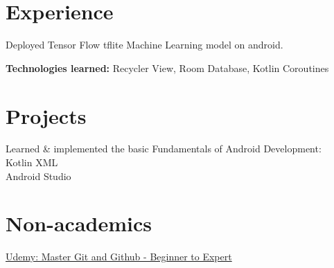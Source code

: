 \documentclass[]{deedy-resume-openfont}
\begin{document}
\begin{minipage}[t]{0.66\textwidth} 


\section{Experience}

\vspace{\topsep} %
\begin{tightemize}
\item Deployed Tensor Flow tflite Machine Learning model on android.
\item \textbf{Technologies learned: } Recycler View, Room Database, Kotlin Coroutines
\end{tightemize}
\sectionsep







\section{Projects}

\begin{tightemize}
\item Learned \& implemented the basic Fundamentals of Android Development: \\
\quad \textbullet{} Kotlin \textbullet{} XML \\
\quad \textbullet{} Android Studio \\
\end{tightemize}
\sectionsep




\section{Non-academics}
\begin{tightemize} 
\item \href{https://www.udemy.com/certificate/UC-b3157d51-19c3-4510-a924-2206bc5a0903/}{Udemy: Master Git and Github - Beginner to Expert}
\end{tightemize}
\sectionsep



%
% 
% 

\end{minipage} 
\end{document}
